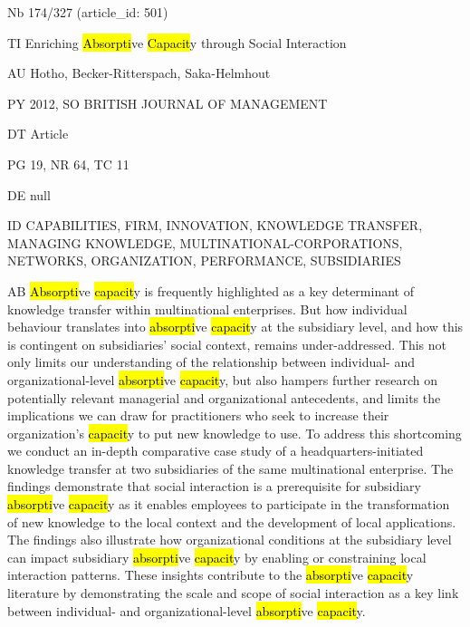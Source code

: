 \documentclass[a4paper]{article}
\begin{document}
\vspace*{-2cm}
Nb \tabto{0cm}174/327 (article\_id: 501)\par
TI \tabto{0cm}Enriching \hl{Absorpti}ve \hl{Capacit}y through Social Interaction\par
AU \tabto{0cm}Hotho, Becker-Ritterspach, Saka-Helmhout\par
PY \tabto{0cm}2012, SO BRITISH JOURNAL OF MANAGEMENT\par
DT \tabto{0cm}Article\par
PG \tabto{0cm}19, NR 64, TC 11\par
DE \tabto{0cm}null\par
ID \tabto{0cm}CAPABILITIES, FIRM, INNOVATION, KNOWLEDGE TRANSFER, MANAGING KNOWLEDGE, MULTINATIONAL-CORPORATIONS, NETWORKS, ORGANIZATION, PERFORMANCE, SUBSIDIARIES\par
AB \tabto{0cm}\hl{Absorpti}ve \hl{capacit}y is frequently highlighted as a key determinant of knowledge transfer within multinational enterprises. But how individual behaviour translates into \hl{absorpti}ve \hl{capacit}y at the subsidiary level, and how this is contingent on subsidiaries' social context, remains under-addressed. This not only limits our understanding of the relationship between individual- and organizational-level \hl{absorpti}ve \hl{capacit}y, but also hampers further research on potentially relevant managerial and organizational antecedents, and limits the implications we can draw for practitioners who seek to increase their organization's \hl{capacit}y to put new knowledge to use. To address this shortcoming we conduct an in-depth comparative case study of a headquarters-initiated knowledge transfer at two subsidiaries of the same multinational enterprise. The findings demonstrate that social interaction is a prerequisite for subsidiary \hl{absorpti}ve \hl{capacit}y as it enables employees to participate in the transformation of new knowledge to the local context and the development of local applications. The findings also illustrate how organizational conditions at the subsidiary level can impact subsidiary \hl{absorpti}ve \hl{capacit}y by enabling or constraining local interaction patterns. These insights contribute to the \hl{absorpti}ve \hl{capacit}y literature by demonstrating the scale and scope of social interaction as a key link between individual- and organizational-level \hl{absorpti}ve \hl{capacit}y.\par
\clearpage
\end{document}
